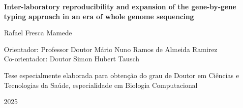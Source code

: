 \begin{titlepage}
\begin{center}
        \vspace{1cm}

        \huge
        \textbf{Inter-laboratory reproducibility and expansion of the gene-by-gene typing approach in an era of whole genome sequencing}
        \normalsize
        
        \vspace{1cm}
        
        \large
        Rafael Fresca Mamede
        \normalsize
        
        \vspace{1cm}
        
        Orientador: Professor Doutor Mário Nuno Ramos de Almeida Ramirez\\
        Co-orientador: Doutor Simon Hubert Tausch
        
        \vfill
        
        Tese especialmente elaborada para obtenção do grau de Doutor em Ciências e Tecnologias da Saúde, especialidade em Biologia Computacional\\
        
        \vspace{0.8cm}
        
        2025
        
    \end{center}
\end{titlepage}